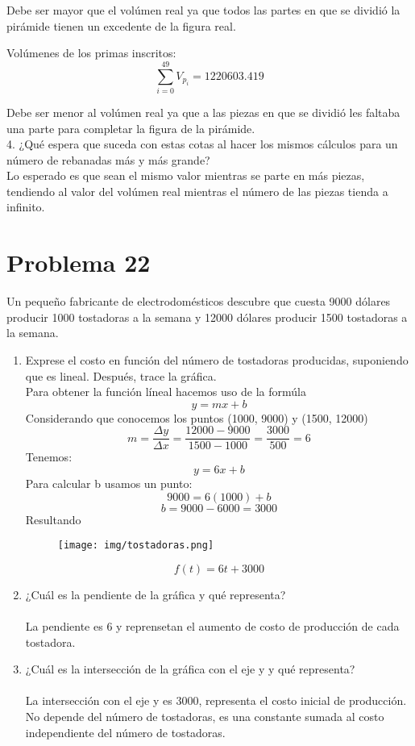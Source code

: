 \documentclass[12pt]{article}
\begin{document}
Debe ser mayor que el volúmen real ya que todos las partes en que se dividió la pirámide tienen un excedente de la figura real.

Volúmenes de los primas inscritos:
\[
\sum_{i=0}^{49} V_{p_i} = 1220603.419      
\]

Debe ser menor al volúmen real ya que a las piezas en que se dividió les faltaba una parte para completar la figura de la pirámide.
\\
4. ¿Qué espera que suceda con estas cotas al hacer los mismos cálculos para un número de
rebanadas más y más grande?
\\
Lo esperado es que sean el mismo valor mientras se parte en más piezas, tendiendo al valor del volúmen real mientras el número de las piezas tienda a infinito.
\clearpage
\section{Problema 22}
Un pequeño fabricante de electrodomésticos descubre que
cuesta 9000 dólares producir 1000 tostadoras a la semana y 12000 dólares producir 1500 tostadoras a la semana.
\begin{enumerate}
\item Exprese el costo en función del número de tostadoras producidas, suponiendo que es lineal. Después, trace la gráfica.\\ 
Para obtener la función líneal hacemos uso de la formúla 
\[
	y = mx + b
\]
Considerando que conocemos los puntos (1000, 9000) y (1500, 12000)
\[
	 m = \frac{\Delta {y}}{\Delta{x}} = \frac{12000-9000}{1500-1000} = \frac{3000}{500} = 6
\]
Tenemos: 
\[
	y = 6x + b  
\]
Para calcular b usamos un punto:
\[
	9000 =6(1000) + b 
\]
\[
	b = 9000 -6000 = 3000 
\]
Resultando 
\begin{figure}[h]
\centering
\texttt{[image: img/tostadoras.png]}
\end{figure}

\[
	f(t) = 6t + 3000
\]
\item  ¿Cuál es la pendiente de la gráfica y qué representa?
\\ \\
La pendiente es 6 y reprensetan el aumento de costo de producción de cada tostadora.
\\  
\item  ¿Cuál es la intersección de la gráfica con el eje y y qué representa?
\\ \\
La intersección con el eje y es 3000, representa el costo inicial de producción. No depende del número de tostadoras, es una constante sumada al costo independiente del número de tostadoras.
\\
\end{enumerate}
\end{document}
